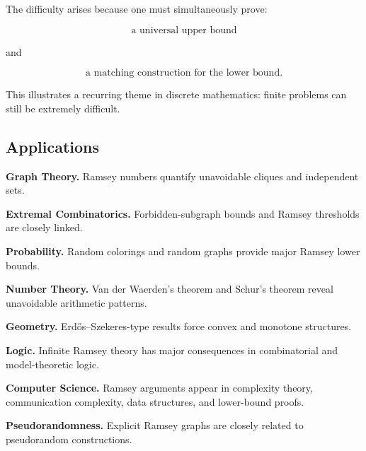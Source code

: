 The difficulty arises because one must simultaneously prove:

\[
\boxed{
\text{a universal upper bound}
}
\]

and

\[
\boxed{
\text{a matching construction for the lower bound}.
}
\]

This illustrates a recurring theme in discrete mathematics: finite
problems can still be extremely difficult.

\subsection{Applications}
\label{subsec:ramsey-theory-applications}

\begin{applicationbox}

\textbf{Graph Theory.}
Ramsey numbers quantify unavoidable cliques and independent sets.

\medskip

\textbf{Extremal Combinatorics.}
Forbidden-subgraph bounds and Ramsey thresholds are closely linked.

\medskip

\textbf{Probability.}
Random colorings and random graphs provide major Ramsey lower bounds.

\medskip

\textbf{Number Theory.}
Van der Waerden's theorem and Schur's theorem reveal unavoidable
arithmetic patterns.

\medskip

\textbf{Geometry.}
Erd\H{o}s--Szekeres-type results force convex and monotone structures.

\medskip

\textbf{Logic.}
Infinite Ramsey theory has major consequences in combinatorial and
model-theoretic logic.

\medskip

\textbf{Computer Science.}
Ramsey arguments appear in complexity theory, communication complexity,
data structures, and lower-bound proofs.

\medskip

\textbf{Pseudorandomness.}
Explicit Ramsey graphs are closely related to pseudorandom
constructions.

\end{applicationbox}

